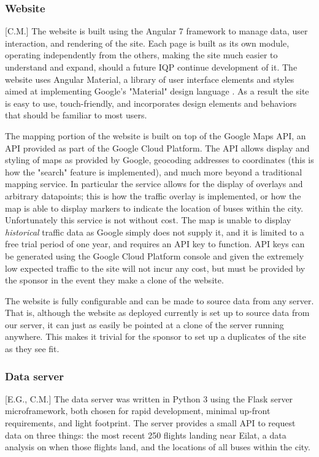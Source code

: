 \documentclass[12pt]{article}                       %
\begin{document}
\subsubsection{Website}[C.M.]
The website is built using the Angular 7 framework to manage data, user interaction, and rendering of the site. Each page is built as its own module, operating independently from the others, making the site much easier to understand and expand, should a future IQP continue development of it. The website uses Angular Material, a library of user interface elements and styles aimed at implementing Google's "Material" design language \cite{2019AngularMaterial}. As a result the site is easy to use, touch-friendly, and incorporates design elements and behaviors that should be familiar to most users.

The mapping portion of the website is built on top of the Google Maps API, an API provided as part of the Google Cloud Platform. The API allows display and styling of maps as provided by Google, geocoding addresses to coordinates (this is how the "search" feature is implemented), and much more beyond a traditional mapping service. In particular the service allows for the display of overlays and arbitrary datapoints; this is how the traffic overlay is implemented, or how the map is able to display markers to indicate the location of buses within the city. Unfortunately this service is not without cost. The map is unable to display \textit{historical} traffic data as Google simply does not supply it, and it is limited to a free trial period of one year, and requires an API key to function. API keys can be generated using the Google Cloud Platform console and given the extremely low expected traffic to the site will not incur any cost, but must be provided by the sponsor in the event they make a clone of the website.

The website is fully configurable and can be made to source data from any server. That is, although the website as deployed currently is set up to source data from our server, it can just as easily be pointed at a clone of the server running anywhere. This makes it trivial for the sponsor to set up a duplicates of the site as they see fit.

\subsubsection{Data server}[E.G., C.M.]
The data server was written in Python 3 using the Flask server microframework, both chosen for rapid development, minimal up-front requirements, and light footprint. The server provides a small API to request data on three things: the most recent 250 flights landing near Eilat, a data analysis on when those flights land, and the locations of all buses within the city.
\end{document}
